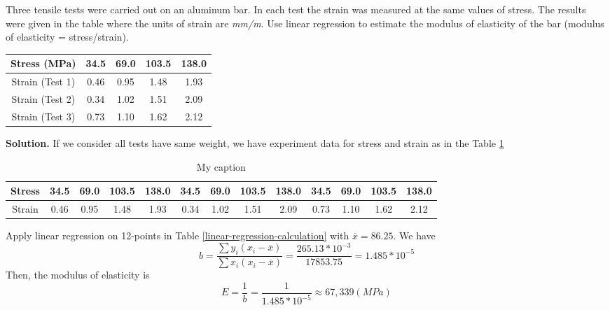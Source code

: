 \begin{exercise}{4} %
Three tensile tests were carried out on an aluminum bar. In each test the strain was measured at the same values of stress. The results were given in the table where the units of strain are \textit{mm/m}. Use linear regression to estimate the modulus of elasticity of the bar (modulus of elasticity = stress/strain).

\begin{table}[h]
\centering
\begin{tabular}{|c|c|c|c|c|}
\hline
Stress (MPa) & 34.5& 69.0 &103.5 &138.0 \\ \hline
Strain (Test 1) &0.46& 0.95 &1.48& 1.93 \\ \hline
Strain (Test 2)& 0.34 &1.02 &1.51& 2.09 \\ \hline
Strain (Test 3) &0.73& 1.10& 1.62& 2.12 \\ \hline
\end{tabular}
\end{table}

\textbf{Solution.}
If we consider all tests have same weight, we have experiment data for stress and strain as in the Table \ref{tab:stress-strain}

\begin{table}[h]
\centering
\begin{tabular}{|c|c|c|c|c|c|c|c|c|c|c|c|c|}
\hline
Stress & 34.5& 69.0 &103.5 &138.0 & 34.5& 69.0 &103.5 &138.0 & 34.5& 69.0 &103.5 &138.0\\ \hline
Strain &0.46& 0.95 &1.48& 1.93 & 0.34 &1.02 &1.51& 2.09 &0.73& 1.10& 1.62& 2.12 \\ \hline
\end{tabular}
\caption{My caption}
\label{tab:stress-strain}
\end{table}
Apply linear regression on 12-points in Table \ref{linear-regression-calculation} with $\overline{x} = 86.25$.
We have $$b=\frac{\sum y_i(x_i-\overline{x})}{\sum x_i(x_i-\overline{x})} = \frac{265.13*10^{-3}}{17853.75} = 1.485*10^{-5}$$
Then, the modulus of elasticity is
$$E=\frac{1}{b}=\frac{1}{1.485*10^{-5}} \approx 67,339 (MPa)$$


\end{exercise}
